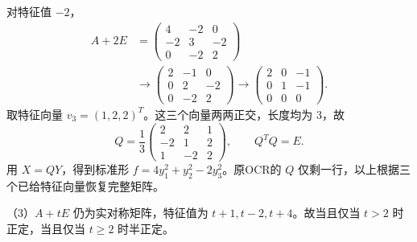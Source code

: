 \documentclass[11pt,fontset=fandol]{ctexart}
\begin{document}
对特征值 \(-2\)， \[
\begin{aligned}
A+2E&=\begin{pmatrix}4&-2&0\\-2&3&-2\\0&-2&2\end{pmatrix}\\
&\longrightarrow\begin{pmatrix}2&-1&0\\0&2&-2\\0&-2&2\end{pmatrix}
\longrightarrow\begin{pmatrix}2&0&-1\\0&1&-1\\0&0&0\end{pmatrix}.
\end{aligned}
\] 取特征向量 \(v_3=(1,2,2)^T\)。这三个向量两两正交，长度均为 \(3\)，故
\[
Q=\frac13\begin{pmatrix}2&2&1\\-2&1&2\\1&-2&2\end{pmatrix},\qquad Q^TQ=E.
\] 用 \(X=QY\)，得到标准形 \(f=4y_1^2+y_2^2-2y_3^2\)。原OCR的 \(Q\)
仅剩一行，以上根据三个已给特征向量恢复完整矩阵。

（3）\(A+tE\) 仍为实对称矩阵，特征值为 \(t+1,t-2,t+4\)。故当且仅当
\(t>2\) 时正定，当且仅当 \(t\ge2\) 时半正定。
\end{document}
